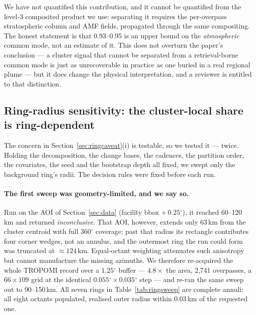 \documentclass[11pt,a4paper]{article}
\providecommand{\degree}{\ensuremath{^{\circ}}}
\begin{document}
We have not quantified this contribution, and it cannot be quantified from the level-3 composited
product we use: separating it requires the per-overpass stratospheric column and AMF fields,
propagated through the same compositing. The honest statement is that 0.93--0.95 is an upper
bound on the \emph{atmospheric} common mode, not an estimate of it. This does not overturn the
paper's conclusion --- a cluster signal that cannot be separated from a retrieval-borne common
mode is just as unrecoverable in practice as one buried in a real regional plume --- but it does
change the physical interpretation, and a reviewer is entitled to that distinction.

\subsection{Ring-radius sensitivity: the cluster-local share is ring-dependent}
\label{sec:ringsweep}

The concern in Section~\ref{sec:ringcaveat}(i) is testable, so we tested it --- twice. Holding the
decomposition, the change bases, the cadences, the partition order, the covariates, the seed and
the bootstrap depth all fixed, we swept only the background ring's radii. The decision rules were
fixed before each run.

\paragraph{The first sweep was geometry-limited, and we say so.} Run on the AOI of
Section~\ref{sec:data} (facility bbox $+\,0.25\degree$), it reached 60--120\,km and returned
\emph{inconclusive}. That AOI, however, extends only 63\,km from the cluster centroid with full
$360\degree$ coverage; past that radius its rectangle contributes four corner wedges, not an
annulus, and the outermost ring the run could form was truncated at $\approx124$\,km. Equal-octant
weighting attenuates such anisotropy but cannot manufacture the missing azimuths. We therefore
re-acquired the whole TROPOMI record over a $1.25\degree$ buffer --- $4.8\times$ the area,
2{,}741 overpasses, a $66\times109$ grid at the identical $0.055\degree\times0.035\degree$ step
--- and re-ran the same sweep out to 90--150\,km. All seven rings in
Table~\ref{tab:ringsweep} are complete annuli: all eight octants populated, realised outer radius
within 0.03\,km of the requested one.
\end{document}
